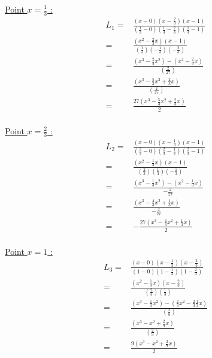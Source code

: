 \documentclass{article}
\begin{document}
\begin{enumerate}
\underline{Point $x = \frac{1}{3}$ :}
\begin{equation*}
  \begin{split}
    L_1 = & \frac{(x - 0) (x - \frac{2}{3}) (x - 1)}
    {(\frac{1}{3} - 0 ) (\frac{1}{3} - \frac{2}{3}) (\frac{1}{3} - 1)}
    \\
    = & \frac{(x^2 - \frac{2}{3}x) (x - 1)}
    {(\frac{1}{3}) (- \frac{1}{3}) (- \frac{2}{3})} \\
    = & \frac{(x^3 - \frac{2}{3}x^2) - (x^2 - \frac{2}{3}x)}
    {(\frac{2}{27})} \\
    = & \frac{(x^3 - \frac{5}{3}x^2 + \frac{2}{3}x)}
    {(\frac{2}{27})} \\
    = & \frac{27 (x^3 - \frac{5}{3}x^2 + \frac{2}{3}x)}
    {2} \\
  \end{split}
\end{equation*}


\underline{Point $x = \frac{2}{3}$ :}
\begin{equation*}
  \begin{split}
    L_2 = & \frac{(x - 0) (x - \frac{1}{3}) (x - 1)}
    {(\frac{2}{3} - 0 ) (\frac{2}{3} - \frac{1}{3}) (\frac{2}{3} - 1)}
    \\
    = & \frac{(x^2 - \frac{1}{3}x) (x - 1)}
    {(\frac{2}{3}) (\frac{1}{3}) (- \frac{1}{3})}
    \\
    = & \frac{(x^3 - \frac{1}{3}x^2) - (x^2 - \frac{1}{3}x)}
    {- \frac{2}{27}}
    \\
    = & \frac{(x^3 - \frac{4}{3}x^2 + \frac{1}{3}x)}
    {- \frac{2}{27}}
    \\
    = & - \frac{27 (x^3 - \frac{4}{3}x^2 + \frac{1}{3}x)}
    {2}
    \\
  \end{split}
\end{equation*}

\underline{Point $x = 1$ :}
\begin{equation*}
  \begin{split}
    L_3 = & \frac{(x - 0) (x - \frac{1}{3}) (x - \frac{2}{3})}
    {(1 - 0 ) (1 - \frac{1}{3}) (1 - \frac{2}{3})}
    \\
    = & \frac{(x^2 - \frac{1}{3} x) (x - \frac{2}{3})}
    {(\frac{2}{3}) (\frac{1}{3})}
    \\
    = & \frac{(x^3 - \frac{1}{3} x^2) - (\frac{2}{3}x^2 - \frac{2}{3}\frac{1}{3} x)}
    {(\frac{2}{9})}
    \\
    = & \frac{(x^3 - x^2 + \frac{2}{9} x)}
    {(\frac{2}{9})}
    \\
    = & \frac{ 9 (x^3 - x^2 + \frac{2}{9} x)}
    {2}
    \\
  \end{split}
\end{equation*}


\end{enumerate}
\end{document}
